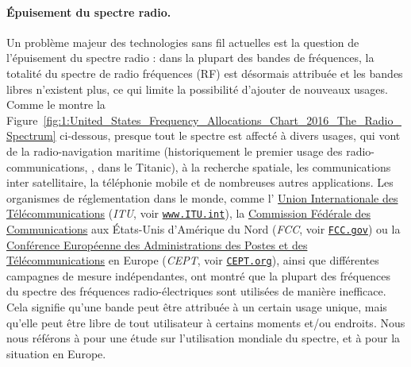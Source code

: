\begin{resume_fr}
\paragraph{Épuisement du spectre radio.}
%
Un problème majeur des technologies sans fil actuelles est la question de l'épuisement du spectre radio :
dans la plupart des bandes de fréquences, la totalité du spectre de radio fréquences (RF) est désormais attribuée et les bandes libres n'existent plus, ce qui limite la possibilité d'ajouter de nouveaux usages.
Comme le montre la Figure~\ref{fig:1:United_States_Frequency_Allocations_Chart_2016_The_Radio_Spectrum} ci-dessous,
presque tout le spectre
est affecté à divers usages, qui vont de la radio-navigation maritime (historiquement le premier usage des radio-communications, \eg, dans le Titanic), à la recherche spatiale, les communications inter satellitaire, la téléphonie mobile et de nombreuses autres applications.
%
Les organismes de réglementation dans le monde, comme l'
\href{https://www.itu.int/en/Pages/default.aspx}{Union Internationale des Télécommunications} (\emph{ITU}, voir \href{https://www.itu.int/}{\texttt{www.ITU.int}}),
la \href{https://www.fcc.gov/}{Commission Fédérale des Communications} aux États-Unis d'Amérique du Nord (\emph{FCC}, voir \href{https://www.fcc.gov/}{\texttt{FCC.gov}})
ou la \href{https://cept.org}{Conférence Européenne des Administrations des Postes et des Télécommunications} en Europe (\emph{CEPT}, voir \href{https://www.CEPT.org/}{\texttt{CEPT.org}}),
ainsi que différentes campagnes de mesure indépendantes, ont montré que la plupart des fréquences du spectre des fréquences radio-électriques sont utilisées de manière inefficace.
Cela signifie qu'une bande peut être attribuée à un certain usage unique, mais qu'elle peut être libre de tout utilisateur à certains moments et/ou endroits.
Nous nous référons à \cite{patil2011survey} pour une étude sur l'utilisation mondiale du spectre, et à \cite{valenta2010survey} pour la situation en Europe.



\end{resume_fr}
